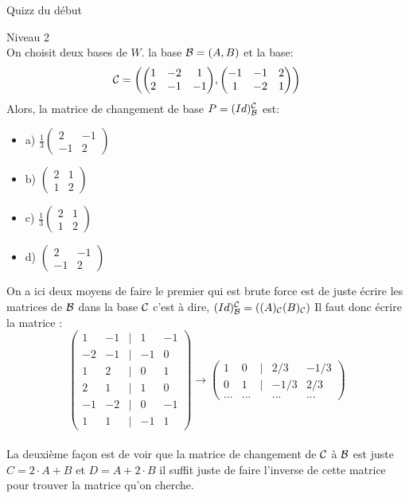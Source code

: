 \begin{parag}{Quizz du début}
\begin{subparag}{Niveau 2}
        \\
        On choisit deux bases de $W$. la base $\mathcal{B} = (A, B)$ et la base:
        \[\cmath = \left(\begin{pmatrix}
            1 & -2 & 1\\ 2 & -1 & -1
        \end{pmatrix}, \begin{pmatrix}
            -1 & -1 & 2 \\ 1 & -2 & 1
        \end{pmatrix}\right)\]
        Alors, la matrice de changement de base $P = (Id)_{\mathcal{B}}^{\mathcal{C}}$ est:
        \begin{itemize}
            \item a) $\frac{1}{3}\begin{pmatrix}
                2 & -1 \\ -1 & 2
            \end{pmatrix}$
            \item b) $\begin{pmatrix}
                2 & 1 \\ 1 & 2
            \end{pmatrix}$
            \item c) $\frac{1}{3} \begin{pmatrix}
                2 & 1 \\ 1 &  2
            \end{pmatrix}$
            \item d) $\begin{pmatrix}
                2 & -1 \\ -1 & 2
            \end{pmatrix}$
        \end{itemize}
        On a ici deux moyens de faire le premier qui est brute force est de juste écrire les matrices de $\mathcal{B}$ dans la base $\mathcal{C}$ c'est à dire, $(Id)_\bmath^\cmath = \left((A)_\cmath (B)_\cmath\right)$
        Il faut donc écrire la matrice :
        \[\begin{pmatrix}
            1 & -1 &| & 1 & -1 \\
            -2 & -1 &| & -1 & 0 \\
            1 & 2 &| & 0 & 1 \\
            2 & 1 &| & 1 & 0 \\
            -1 & -2 &| & 0 & -1 \\
            1 & 1 &| & -1 & 1 
        \end{pmatrix} \to \begin{pmatrix}
            1 & 0&| & 2/3 & -1/3\\
            0 & 1&|& -1/3 & 2/3\\
            ... & ...& & ... & ...
        \end{pmatrix}\]
        \\
        La deuxième façon est de voir que la matrice de changement de $\mathcal{C}$ à $\mathcal{B}$ est juste $C = 2\cdot A + B$ et $D = A + 2\cdot B$ il suffit juste de faire l'inverse de cette matrice pour trouver la matrice qu'on cherche.
    \end{subparag}
\end{parag}

